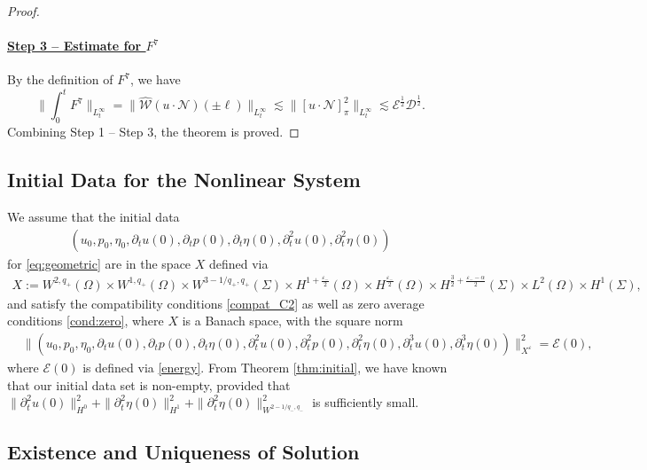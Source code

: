 \documentclass[letterpaper,reqno,10pt,twoside]{amsart}
\theoremstyle{definition}
\theoremstyle{remark}
\def\p{\partial}
\def\Om{\Omega}
\begin{document}
\begin{proof}
			\paragraph{\underline{Step 3 -- Estimate for $F^{7}$}} 
			By the definition of $F^{7}$, we have
			\[
			\|\int_{0}^{t}F^{7}\|_{L_{t}^{\infty}}=\|\hat{\mathcal{W}}(u\cdot\mathcal{N})(\pm\ell)\|_{L_{t}^{\infty}}\lesssim \|[u\cdot \mathcal{N}]_{\pi}^{2}\|_{L_{t}^{\infty}}\lesssim\mathscr{E}^{\frac{1}{2}}\mathscr{D}^{\frac{1}{2}}.
			\]
			Combining Step 1 -- Step 3, the theorem is proved.
		\end{proof}
		
		
		\subsection{Initial Data for the Nonlinear System}\label{sec:initial_nonlinear1}
		
		
		We assume that the initial data
		\begin{align}\label{initial_ep_nonlinear}
			(u_0, p_0, \eta_0, \p_tu(0), \p_tp(0), \p_t\eta(0), \p_t^2u(0),\p_t^2\eta(0))
		\end{align}
		for \eqref{eq:geometric} are in the space $X$ defined via
		\[
		\begin{aligned}
			X:=W^{2,q_+}(\Om)\times W^{1,q_+}(\Om)\times W^{3-1/q_+,q_+}(\Sigma)\times H^{1+\frac{\varepsilon_{-}}{2}}(\Om)\times H^{\frac{\varepsilon_{-}}{2}}(\Om)\times H^{\frac{3}{2}+\frac{\varepsilon_{-}-\alpha}{2}}(\Sigma)
			\times L^{2}(\Om)\times H^{1}(\Sigma),
		\end{aligned}
		\]
		and satisfy the compatibility conditions \eqref{compat_C2}
		as well as zero average conditions \eqref{cond:zero},
		where $X$ is a Banach space, with the square norm
		\[
		\begin{aligned}
			&\|(u_0, p_0, \eta_0, \p_tu(0), \p_tp(0), \p_t\eta(0), \p_t^2u(0), \p_{t}^{2}p(0),\p_t^2\eta(0), \p_{t}^{3}u(0),\p_t^3\eta(0))\|_{X^\varepsilon}^2
			=\mathcal{E}(0),
		\end{aligned}
		\]
		where $\mathcal{E}(0)$ is defined via \eqref{energy}.
		From Theorem \ref{thm:initial}, we have known that our initial data set is non-empty, provided that $\|\p_t^2u(0)\|_{H^0}^2+\|\p_t^2\eta(0)\|_{H^1}^2+\|\p_t^2\eta(0)\|_{W^{2-1/q_-,q_-}}^2$ is sufficiently small.
		
		
		\subsection{Existence and Uniqueness of Solution}
		
\end{document}
